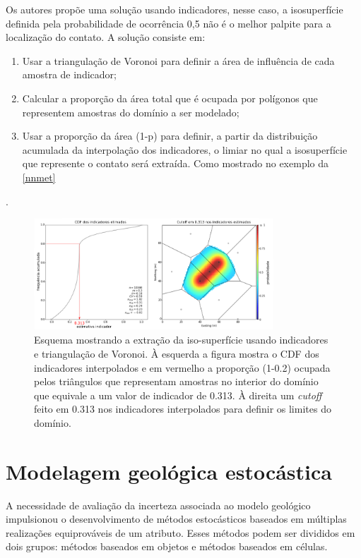 Os autores propõe uma solução usando indicadores, nesse caso, a isosuperfície definida pela probabilidade de ocorrência 0,5 não é o melhor palpite para a localização do contato. A solução consiste em:

\begin{enumerate}[label=\roman*]
    \item Usar a triangulação de Voronoi para definir a área de influência de cada amostra de indicador;
    \item Calcular a proporção da área total que é ocupada por polígonos que representem amostras do domínio a ser modelado;
    \item Usar a proporção da área (1-p) para definir, a partir da distribuição acumulada da interpolação dos indicadores, o limiar no qual a isosuperfície que represente o contato será extraída. Como mostrado no exemplo da \autoref{nnmet} 
\end{enumerate}.

\begin{figure}[H]
\caption{\label{nnmet} Esquema mostrando a extração da iso-superfície usando indicadores e triangulação de Voronoi. À esquerda a figura mostra o CDF dos indicadores interpolados e em vermelho a proporção (1-0.2) ocupada pelos triângulos que representam amostras no interior do domínio que equivale a um valor de indicador de 0.313. À direita um \textit{cutoff} feito em 0.313 nos indicadores interpolados para definir os limites do domínio.}
	\centering
		\includegraphics[width=0.8\textwidth]{capitulo_2/imagens/nnmet.png}
\end{figure}

\section{Modelagem geológica estocástica}

A necessidade de avaliação da incerteza associada ao modelo geológico impulsionou o desenvolvimento de métodos estocásticos baseados em múltiplas realizações equiprováveis de um atributo. Esses métodos podem ser divididos em dois grupos: métodos baseados em objetos e métodos baseados em células. 


